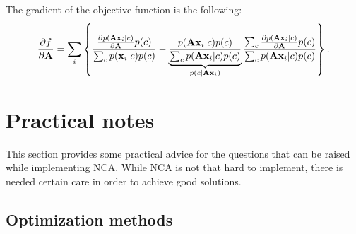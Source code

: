 	The gradient of the objective function is the following:
	\begin{align}
	    \frac{\partial f}{\partial \mathbf{A}} =
	      \sum_i \left\{
	                \frac
	                {
	                    \frac{\partial p(\mathbf{A}\mathbf{x}_i|c)}{\partial \mathbf{A}}p(c)
	                }
	                {
	                    \sum_c p(\mathbf{x}_i|c)p(c)
	                }
	                - \underbrace{\frac{
	                    p(\mathbf{A}\mathbf{x}_i|c)p(c)
	                }{
	                    \sum_c p(\mathbf{A}\mathbf{x}_i|c)p(c)
	                }}_{p(c|\mathbf{A}\mathbf{x}_i)}
	                \frac{
	                    \sum_c \frac{\partial p(\mathbf{A}\mathbf{x}_i|c)}{\partial \mathbf{A}}p(c)
	                }{
	                    \sum_c p(\mathbf{A}\mathbf{x}_i|c)p(c)
	                }
	             \right \}.
	    \label{eq:nca-cc-kde-grad}
	\end{align}
	

\section{Practical notes}
\label{sec:practical-notes}

	This section provides some practical advice for the questions 
	that can be raised while implementing NCA. 
	While NCA is not that hard to implement, there is needed certain care
	in order to achieve good solutions.

\subsection{Optimization methods}
\label{subsec:optimization}

